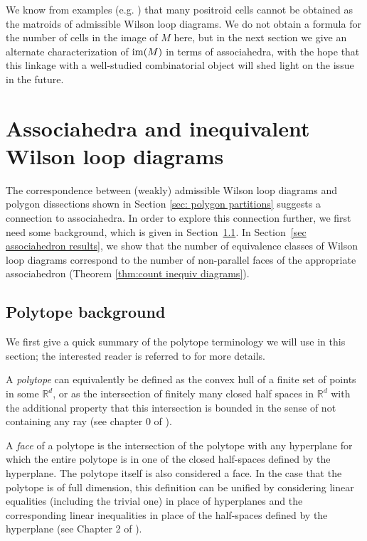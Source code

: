 \documentclass[11pt]{article}
\theoremstyle{remark}
\theoremstyle{definition}
\begin{document}
We know from examples (e.g. \cite[Remark 4.2]{casestudy}) that many positroid cells cannot be obtained as the matroids of admissible Wilson loop diagrams. We do not obtain a formula for the number of cells in the image of $M$ here, but in the next section we give an alternate characterization of ${\rm im}(M)$ in terms of associahedra, with the hope that this linkage with a well-studied combinatorial object will shed light on the issue in the future.

\section{Associahedra and inequivalent Wilson loop diagrams}\label{sec associahedron}

The correspondence between (weakly) admissible Wilson loop diagrams and polygon dissections shown in Section \ref{sec: polygon partitions} suggests a connection to associahedra. In order to explore this connection further, we first need some background, which is given in Section~\ref{sec polytope background}. In Section~\ref{sec associahedron results}, we show that the number of equivalence classes of Wilson loop diagrams correspond to the number of non-parallel faces of the appropriate associahedron (Theorem \ref{thm:count inequiv diagrams}). 

\subsection{Polytope background}\label{sec polytope background}

We first give a quick summary of the polytope terminology we will use in this section; the interested reader is referred to \cite{Ziegler} for more details.

A \emph{polytope} can equivalently be defined as the convex hull of a finite set of points in some $\mathbb{R}^d$, or as the intersection of finitely many closed half spaces in $\mathbb{R}^d$ with the additional property that this intersection is bounded in the sense of not containing any ray (see chapter 0 of \cite{Ziegler}).

A \emph{face} of a polytope is the intersection of the polytope with any hyperplane for which the entire polytope is in one of the closed half-spaces defined by the hyperplane.  The polytope itself is also considered a face. In the case that the polytope is of full dimension, this definition can be unified by considering linear equalities (including the trivial one) in place of hyperplanes and the corresponding linear inequalities in place of the half-spaces defined by the hyperplane (see Chapter 2 of \cite{Ziegler}).  
\end{document}
